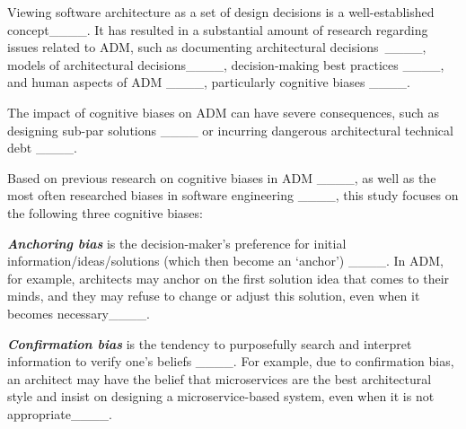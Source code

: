     Viewing software architecture as a set of design decisions is a well-established concept____. It has resulted in a substantial amount of research regarding issues related to ADM, such as documenting architectural decisions~____, models of architectural decisions____, decision-making best practices ____, and human aspects of ADM ____, particularly cognitive biases ____.

    The impact of cognitive biases on ADM can have severe consequences, such as designing sub-par solutions ____ or incurring dangerous architectural technical debt ____.

    Based on previous research on cognitive biases in ADM ____, as well as the most often researched biases in software engineering ____, this study focuses on the following three cognitive biases: %

    \textbf{\textit{Anchoring bias}} is the decision-maker's preference for initial information/ideas/so\-lu\-tions (which then become an `anchor') ____. 
    \color{black}
    In ADM, for example, architects may anchor on the first solution idea that comes to their minds, and they may refuse to change or adjust this solution, even when it becomes necessary____.
    \color{black}

    \textbf{\textit{Confirmation bias}} is the tendency to purposefully search and interpret information to verify one's beliefs ____. 
\color{black}
    For example, due to confirmation bias, an architect may have the belief that microservices are the best architectural style and insist on designing a microservice-based system, even when it is not appropriate____.
    \color{black}
    
